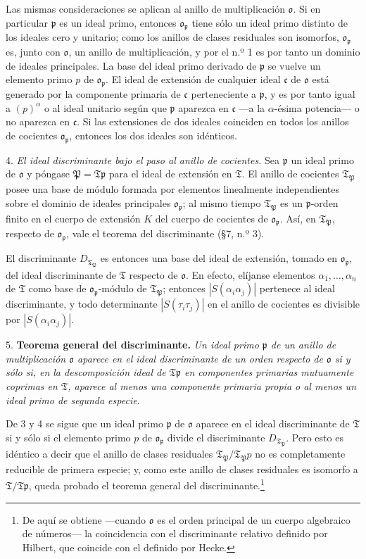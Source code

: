 \documentclass[11pt]{article}
\providecommand{\mT}{\mathfrak{T}}
\providecommand{\mo}{\mathfrak{o}}
\providecommand{\mP}{\mathfrak{P}}
\providecommand{\mc}{\mathfrak{c}}
\providecommand{\mpideal}{\mathfrak{p}}
\begin{document}
Las mismas consideraciones se aplican al anillo de multiplicación $\mo$. Si en particular $\mpideal$ es un ideal primo, entonces $\mo_\mpideal$ tiene sólo un ideal primo distinto de los ideales cero y unitario; como los anillos de clases residuales son isomorfos, $\mo_\mpideal$ es, junto con $\mo$, un anillo de multiplicación, y por el n.º 1 es por tanto un dominio de ideales principales. La base del ideal primo derivado de $\mpideal$ se vuelve un elemento primo $p$ de $\mo_\mpideal$. El ideal de extensión de cualquier ideal $\mc$ de $\mo$ está generado por la componente primaria de $\mc$ perteneciente a $\mpideal$, y es por tanto igual a $(p)^\alpha$ o al ideal unitario según que $\mpideal$ aparezca en $\mc$ ---a la $\alpha$-ésima potencia--- o no aparezca en $\mc$. Si las extensiones de dos ideales coinciden en todos los anillos de cocientes $\mo_\mpideal$, entonces los dos ideales son idénticos.

4. \emph{El ideal discriminante bajo el paso al anillo de cocientes.} Sea $\mpideal$ un ideal primo de $\mo$ y póngase $\mP=\mT\mpideal$ para el ideal de extensión en $\mT$. El anillo de cocientes $\mT_\mP$ posee una base de módulo formada por elementos linealmente independientes sobre el dominio de ideales principales $\mo_\mpideal$; al mismo tiempo $\mT_\mP$ es un $\mpideal$-orden finito en el cuerpo de extensión $K$ del cuerpo de cocientes de $\mo_\mpideal$. Así, en $\mT_\mP$, respecto de $\mo_\mpideal$, vale el teorema del discriminante (\S 7, n.º 3).

El discriminante $D_{\mT_\mP}$ es entonces una base del ideal de extensión, tomado en $\mo_\mpideal$, del ideal discriminante de $\mT$ respecto de $\mo$. En efecto, elíjanse elementos $\alpha_1,\ldots,\alpha_n$ de $\mT$ como base de $\mo_\mpideal$-módulo de $\mT_\mP$; entonces $|S(\alpha_i\alpha_j)|$ pertenece al ideal discriminante, y todo determinante $|S(\tau_i\tau_j)|$ en el anillo de cocientes es divisible por $|S(\alpha_i\alpha_j)|$.

5. \textbf{Teorema general del discriminante.} \emph{Un ideal primo $\mpideal$ de un anillo de multiplicación $\mo$ aparece en el ideal discriminante de un orden respecto de $\mo$ si y sólo si, en la descomposición ideal de $\mT\mpideal$ en componentes primarias mutuamente coprimas en $\mT$, aparece al menos una componente primaria propia o al menos un ideal primo de segunda especie.}

De 3 y 4 se sigue que un ideal primo $\mpideal$ de $\mo$ aparece en el ideal discriminante de $\mT$ si y sólo si el elemento primo $p$ de $\mo_\mpideal$ divide el discriminante $D_{\mT_\mP}$. Pero esto es idéntico a decir que el anillo de clases residuales $\mT_\mP/\mT_\mP p$ no es completamente reducible de primera especie; y, como este anillo de clases residuales es isomorfo a $\mT/\mT\mpideal$, queda probado el teorema general del discriminante.\footnote{De aquí se obtiene ---cuando $\mo$ es el orden principal de un cuerpo algebraico de números--- la coincidencia con el discriminante relativo definido por Hilbert, que coincide con el definido por Hecke.}
\end{document}

